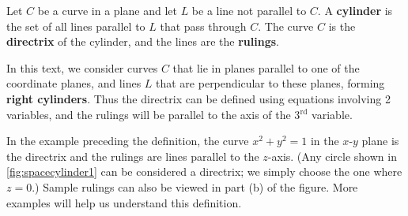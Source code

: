 
\begin{definition}[Cylinder]\label{def:cylinder}
Let $C$ be a curve in a plane and let $L$ be a line not parallel to $C$. A \textbf{cylinder} is the set of all lines parallel to $L$ that pass through $C$. The curve $C$ is the \textbf{directrix} of the cylinder, and the lines are the \textbf{rulings}.
\end{definition}

In this text, we consider curves $C$ that lie in planes parallel to one of the coordinate planes, and lines $L$ that are perpendicular to these planes, forming \textbf{right cylinders}. Thus the directrix can be defined using equations involving 2 variables, and the rulings will be parallel to the axis of the 3$^\text{rd}$ variable.

In the example preceding the definition, the curve $x^2+y^2=1$ in the $x$-$y$ plane is the directrix and the rulings are lines parallel to the $z$-axis. (Any circle shown in \autoref{fig:spacecylinder1} can be considered a directrix; we simply choose the one where $z=0$.) Sample rulings can also be viewed in part (b) of the figure. More examples will help us understand this definition.


